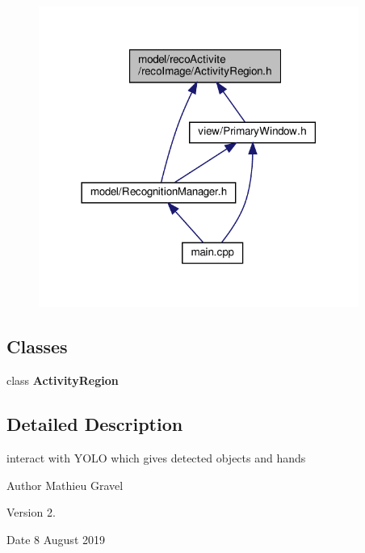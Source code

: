\begin{figure}[H]
\begin{center}
\leavevmode
\includegraphics[width=297pt]{_activity_region_8h__dep__incl}
\end{center}
\end{figure}
\subsection*{Classes}
\begin{DoxyCompactItemize}
\item 
class \textbf{ Activity\+Region}
\end{DoxyCompactItemize}


\subsection{Detailed Description}
interact with Y\+O\+LO which gives detected objects and hands 

\begin{DoxyAuthor}{Author}
Mathieu Gravel 
\end{DoxyAuthor}
\begin{DoxyVersion}{Version}
2. 
\end{DoxyVersion}
\begin{DoxyDate}{Date}
8 August 2019 
\end{DoxyDate}
